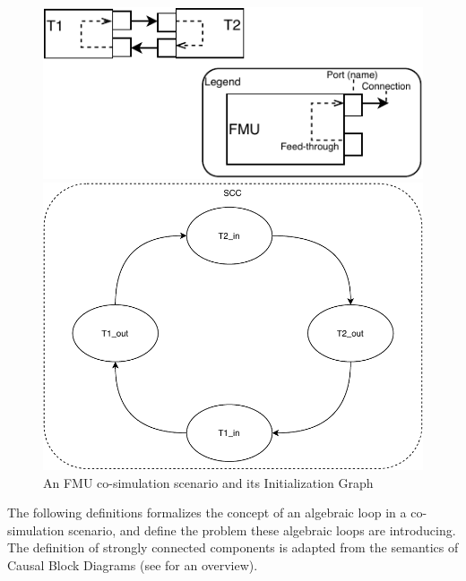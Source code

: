 \begin{figure}
    \centering
    \begin{minipage}{0.55\textwidth}
        \centering
    \includegraphics[width=1\textwidth]{images/fmu_cycle.pdf}
    \end{minipage}\hfill
    \begin{minipage}{0.35\textwidth}
        \centering
    \includegraphics[width=1\textwidth]{images/SCC.pdf}
    \end{minipage}
    \caption{An FMU co-simulation scenario and its Initialization Graph}
    \label{fig:fmu_cycle}
\end{figure}


The following definitions formalizes the concept of an algebraic loop in a co-simulation scenario, and define the problem these algebraic loops are introducing.
The definition of strongly connected components is adapted from the semantics of Causal Block Diagrams (see \cite{Gomes2020} for an overview).

